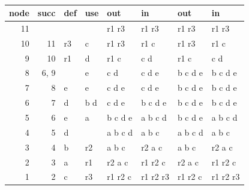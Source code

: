 \begin{solution}
\\
\hfill
\begin{tabular}[t]{r|r>{\lstenumstyle}l>{\lstenumstyle}l|>{\lstenumstyle}l>{\lstenumstyle}l|>{\lstenumstyle}l>{\lstenumstyle}l}
node & succ & \textnormal{def} & \textnormal{use} & \textnormal{out} &
\textnormal{in} & \textnormal{out} & \textnormal{in} \\
\hline
11 &        &    &     & r1 r3   & r1 r3    & r1 r3   & r1 r3   \\
10 & 11     & r3 & c   & r1 r3   & r1 c     & r1 r3   & r1 c    \\
 9 & 10     & r1 & d   & r1 c    & c d      & r1 c    & c d     \\
 8 &  6, 9  &    & e   & c d     & c d e    & b c d e & b c d e \\
 7 &  8     & e  & e   & c d e   & c d e    & b c d e & b c d e \\
 6 &  7     & d  & b d & c d e   & b c d e  & b c d e & b c d e \\
 5 &  6     & e  & a   & b c d e & a b c d  & b c d e & a b c d \\
 4 &  5     & d  &     & a b c d & a b c    & a b c d & a b c   \\
 3 &  4     & b  & r2  & a b c   & r2 a c   & a b c   & r2 a c  \\
 2 &  3     & a  & r1  & r2 a c  & r1 r2 c  & r2 a c  & r1 r2 c \\
 1 &  2     & c  & r3  & r1 r2 c & r1 r2 r3 & r1 r2 c & r1 r2 r3
\end{tabular}
\end{solution}
